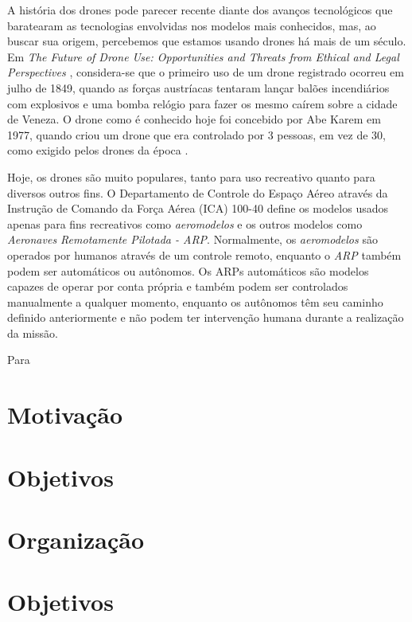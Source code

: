 
A história dos drones pode parecer recente diante dos avanços tecnológicos que baratearam as tecnologias envolvidas nos modelos mais conhecidos, mas, ao buscar sua origem, percebemos que estamos usando drones há mais de um século. Em \textit{The Future of Drone Use: Opportunities and Threats from Ethical and Legal Perspectives} \cite{Custers2016}, considera-se que o primeiro uso de um drone registrado ocorreu em julho de 1849, quando as forças austríacas tentaram lançar balões incendiários com explosivos e uma bomba relógio para fazer os mesmo caírem sobre a cidade de Veneza. O drone como é conhecido hoje foi concebido por Abe Karem em 1977, quando criou um drone que era controlado por 3 pessoas, em vez de 30, como exigido pelos drones da época \cite{Buzzo2015}.

Hoje, os drones são muito populares, tanto para uso recreativo quanto para diversos outros fins. O Departamento de Controle do Espaço Aéreo através da Instrução de Comando da Força Aérea (ICA) 100-40 \cite{CEA2018} define os modelos usados apenas para fins recreativos como \textit{aeromodelos} e os outros modelos como \textit{Aeronaves Remotamente Pilotada - ARP}. Normalmente, os \textit{aeromodelos} são operados por humanos através de um controle remoto, enquanto o \textit{ARP} também podem ser automáticos ou autônomos. Os ARPs automáticos são modelos capazes de operar por conta própria e também podem ser controlados manualmente a qualquer momento, enquanto os autônomos têm seu caminho definido anteriormente e não podem ter intervenção humana durante a realização da missão.

Para

\section{Motivação}
\section{Objetivos}
\section{Organização}
\section{Objetivos}

